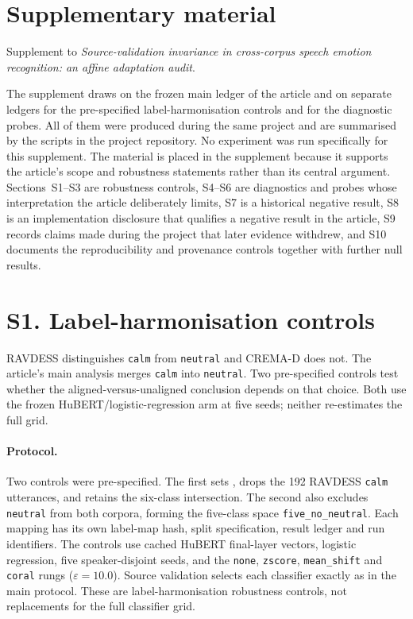 \documentclass[a4paper,fleqn]{cas-dc}
\begin{document}
\let\WriteBookmarks\relax

\linenumbers

\section*{Supplementary material}

Supplement to \emph{Source-validation invariance in cross-corpus speech
emotion recognition: an affine adaptation audit}.

The supplement draws on the frozen main ledger of the article and on separate
ledgers for the pre-specified label-harmonisation controls and for the
diagnostic probes. All of them were produced during the same project and are
summarised by the scripts in the project repository. No experiment was run
specifically for this supplement. The material is placed in the
supplement because it supports the article's scope and robustness statements
rather than its central argument. Sections~S1--S3 are robustness controls,
S4--S6 are diagnostics and probes whose interpretation the article
deliberately limits, S7 is a historical negative result, S8 is an
implementation disclosure that qualifies a negative result in the article, S9
records claims made during the project that later evidence withdrew, and S10
documents the reproducibility and provenance controls together with further
null results.

\section*{S1. Label-harmonisation controls}
\label{sec:s-label}

RAVDESS distinguishes \texttt{calm} from \texttt{neutral} and CREMA-D does not.
The article's main analysis merges \texttt{calm} into \texttt{neutral}. Two
pre-specified controls test whether the aligned-versus-unaligned conclusion
depends on that choice. Both use the frozen HuBERT/logistic-regression arm at
five seeds; neither re-estimates the full grid.

\paragraph{Protocol.} Two controls were pre-specified. The first sets ,
drops the 192 RAVDESS \texttt{calm} utterances, and retains the six-class
intersection. The second also excludes \texttt{neutral} from both corpora,
forming the five-class space \texttt{five\_no\_neutral}. Each mapping has its
own label-map hash, split specification, result ledger and run identifiers. The
controls use cached HuBERT final-layer vectors, logistic regression, five
speaker-disjoint seeds, and the \texttt{none}, \texttt{zscore},
\texttt{mean\_shift} and \texttt{coral} rungs ($\varepsilon=10.0$). Source
validation selects each classifier exactly as in the main protocol. These are
label-harmonisation robustness controls, not replacements for the full
classifier grid.
\end{document}
